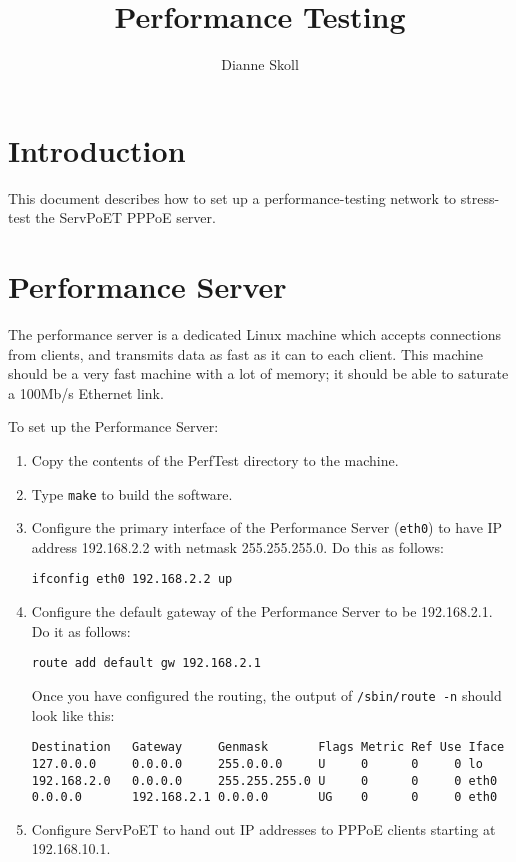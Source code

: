 \documentclass[11pt]{article}
\title{\sv{} Performance Testing}
\author{Dianne Skoll}
\newcommand{\sv}{ServPoET}
\begin{document}
\maketitle
\section{Introduction}

This document describes how to set up a performance-testing network
to stress-test the \sv{} PPPoE server.

\section{Performance Server}

The performance server is a dedicated Linux machine which accepts
connections from clients, and transmits data as fast as it can to
each client.  This machine should be a very fast machine with a lot
of memory; it should be able to saturate a 100Mb/s Ethernet link.

To set up the Performance Server:
\begin{enumerate}
\item Copy the contents of the PerfTest directory to the machine.
\item Type \texttt{make} to build the software.
\item Configure the primary interface of the Performance Server (\texttt{eth0})
  to have IP address 192.168.2.2 with netmask 255.255.255.0.  Do this
  as follows:
\begin{verbatim}
ifconfig eth0 192.168.2.2 up
\end{verbatim}
\item Configure the default gateway of the Performance Server to be
  192.168.2.1.  Do it as follows:
\begin{verbatim}
route add default gw 192.168.2.1
\end{verbatim}

  Once you have configured the routing, the output of \texttt{/sbin/route~-n}
  should look like this:
{\scriptsize
\begin{verbatim}
Destination   Gateway     Genmask       Flags Metric Ref Use Iface
127.0.0.0     0.0.0.0     255.0.0.0     U     0      0     0 lo
192.168.2.0   0.0.0.0     255.255.255.0 U     0      0     0 eth0
0.0.0.0       192.168.2.1 0.0.0.0       UG    0      0     0 eth0
\end{verbatim}
}
\item Configure \sv{} to hand out IP addresses to PPPoE clients starting
  at 192.168.10.1.
\end{enumerate}
\end{document}
